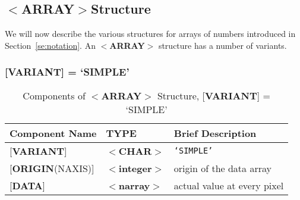 \documentclass[twoside,11pt]{article}
\newcommand{\htmlref}[2]{#1}
\newcommand{\html}[1]{}
\newcommand{\latex}[1]{#1}
\newcommand{\xlabel}[1]{}
\renewcommand{\_}{\texttt{\symbol{95}}}
\begin{document}
\subsection{\xlabel{se_array}$<${\bf ARRAY}$>$Structure\label{se:sarray}}

We will now describe the various structures for arrays of numbers 
introduced in \latex{Section~\ref{se:notation}.}\html{\htmlref{Notation 
and Pseudo-types.}{se:notation}}
An \mbox{$<${\bf ARRAY}$>$} structure has a number of variants.

\subsubsection{{[}{\bf VARIANT}{]} = `SIMPLE'}

\begin{table}[htb]
\centering
\caption{Components of $<${\bf ARRAY}$>$ Structure,
               {[}{\bf VARIANT}{]} = `SIMPLE'}
\begin{tabular}{|l|l|l|}
\hline
Component Name  & TYPE & Brief Description \\ \hline
{[}{\bf VARIANT}{]} & $<${\bf \_CHAR}$>$ & {\tt `SIMPLE'} \\
{[}{\bf ORIGIN}(NAXIS){]} & $<${\bf integer}$>$ & origin of the data array \\
{[}{\bf DATA}{]} & $<${\bf narray}$>$ & actual value at every pixel \\ \hline
\end{tabular}
\end{table}
\end{document}
